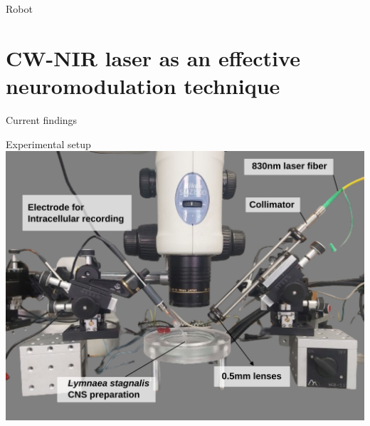 \documentclass[aspectratio=43]{beamer}
\begin{document}
\begin{frame}{Robot}

\end{frame}


\section[CW-NIR Neuromodulation]{CW-NIR laser as an effective neuromodulation technique}
\begin{frame}{Current findings}
\end{frame}
\begin{frame}{Experimental setup}
	\includegraphics[width=\textwidth]{methods/laser-setup_labels.png}
\end{frame}
\end{document}
